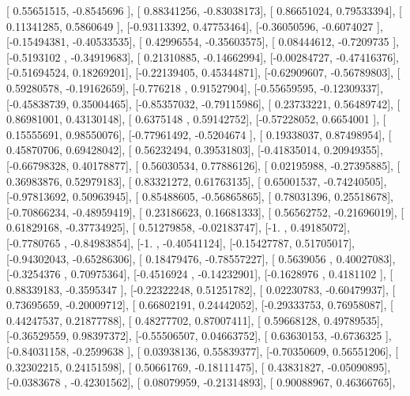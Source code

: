 \documentclass{article}
\begin{document}
       [ 0.55651515, -0.8545696 ],
       [ 0.88341256, -0.83038173],
       [ 0.86651024,  0.79533394],
       [ 0.11341285,  0.5860649 ],
       [-0.93113392,  0.47753464],
       [-0.36050596, -0.6074027 ],
       [-0.15494381, -0.40533535],
       [ 0.42996554, -0.35603575],
       [ 0.08444612, -0.7209735 ],
       [-0.5193102 , -0.34919683],
       [ 0.21310885, -0.14662994],
       [-0.00284727, -0.47416376],
       [-0.51694524,  0.18269201],
       [-0.22139405,  0.45344871],
       [-0.62909607, -0.56789803],
       [ 0.59280578, -0.19162659],
       [-0.776218  ,  0.91527904],
       [-0.55659595, -0.12309337],
       [-0.45838739,  0.35004465],
       [-0.85357032, -0.79115986],
       [ 0.23733221,  0.56489742],
       [ 0.86981001,  0.43130148],
       [ 0.6375148 ,  0.59142752],
       [-0.57228052,  0.6654001 ],
       [ 0.15555691,  0.98550076],
       [-0.77961492, -0.5204674 ],
       [ 0.19338037,  0.87498954],
       [ 0.45870706,  0.69428042],
       [ 0.56232494,  0.39531803],
       [-0.41835014,  0.20949355],
       [-0.66798328,  0.40178877],
       [ 0.56030534,  0.77886126],
       [ 0.02195988, -0.27395885],
       [ 0.36983876,  0.52979183],
       [ 0.83321272,  0.61763135],
       [ 0.65001537, -0.74240505],
       [-0.97813692,  0.50963945],
       [ 0.85488605, -0.56865865],
       [ 0.78031396,  0.25518678],
       [-0.70866234, -0.48959419],
       [ 0.23186623,  0.16681333],
       [ 0.56562752, -0.21696019],
       [ 0.61829168, -0.37734925],
       [ 0.51279858, -0.02183747],
       [-1.        ,  0.49185072],
       [-0.7780765 , -0.84983854],
       [-1.        , -0.40541124],
       [-0.15427787,  0.51705017],
       [-0.94302043, -0.65286306],
       [ 0.18479476, -0.78557227],
       [ 0.5639056 ,  0.40027083],
       [-0.3254376 ,  0.70975364],
       [-0.4516924 , -0.14232901],
       [-0.1628976 ,  0.4181102 ],
       [ 0.88339183, -0.3595347 ],
       [-0.22322248,  0.51251782],
       [ 0.02230783, -0.60479937],
       [ 0.73695659, -0.20009712],
       [ 0.66802191,  0.24442052],
       [-0.29333753,  0.76958087],
       [ 0.44247537,  0.21877788],
       [ 0.48277702,  0.87007411],
       [ 0.59668128,  0.49789535],
       [-0.36529559,  0.98397372],
       [-0.55506507,  0.04663752],
       [ 0.63630153, -0.6736325 ],
       [-0.84031158, -0.2599638 ],
       [ 0.03938136,  0.55839377],
       [-0.70350609,  0.56551206],
       [ 0.32302215,  0.24151598],
       [ 0.50661769, -0.18111475],
       [ 0.43831827, -0.05090895],
       [-0.0383678 , -0.42301562],
       [ 0.08079959, -0.21314893],
       [ 0.90088967,  0.46366765],
\end{document}
